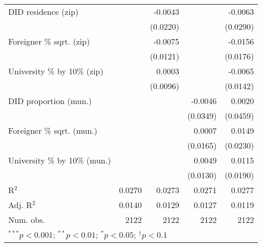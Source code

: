 \begin{tabular}{l D{.}{.}{4.11} D{.}{.}{4.11} D{.}{.}{4.11} D{.}{.}{4.11}}
DID residence (zip)               &                  & -0.0043          &                  & -0.0063          \\
                                  &                  & (0.0220)         &                  & (0.0290)         \\
Foreigner \% sqrt. (zip)          &                  & -0.0075          &                  & -0.0156          \\
                                  &                  & (0.0121)         &                  & (0.0176)         \\
University \% by 10\% (zip)       &                  & 0.0003           &                  & -0.0065          \\
                                  &                  & (0.0096)         &                  & (0.0142)         \\
DID proportion (mun.)             &                  &                  & -0.0046          & 0.0020           \\
                                  &                  &                  & (0.0349)         & (0.0459)         \\
Foreigner \% sqrt. (mun.)         &                  &                  & 0.0007           & 0.0149           \\
                                  &                  &                  & (0.0165)         & (0.0230)         \\
University \% by 10\% (mun.)      &                  &                  & 0.0049           & 0.0115           \\
                                  &                  &                  & (0.0130)         & (0.0190)         \\
\midrule
R$^2$                             & 0.0270           & 0.0273           & 0.0271           & 0.0277           \\
Adj. R$^2$                        & 0.0140           & 0.0129           & 0.0127           & 0.0119           \\
Num. obs.                         & 2122             & 2122             & 2122             & 2122             \\
\bottomrule
{}
\end{tabular}
